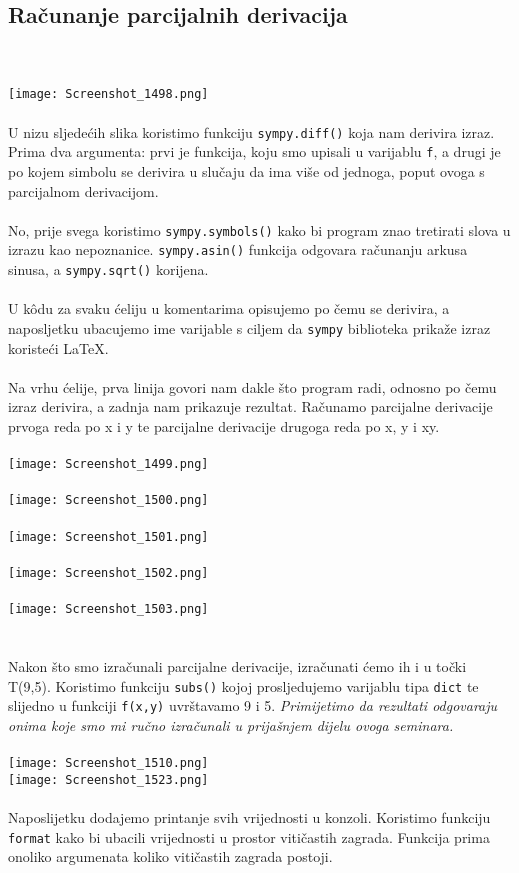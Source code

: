 \documentclass{article}
\begin{document}
\pagebreak

\subsection{Računanje parcijalnih derivacija}
\\~\\
\texttt{[image: Screenshot\_1498.png]}
\\~\\
U nizu sljedećih slika koristimo funkciju \texttt{sympy.diff()} koja nam derivira izraz. Prima dva argumenta: prvi je funkcija, koju smo upisali u varijablu \texttt{f}, a drugi je po kojem simbolu se derivira u slučaju da ima više od jednoga, poput ovoga s parcijalnom derivacijom.
\\~\\
No, prije svega koristimo \texttt{sympy.symbols()} kako bi program znao tretirati slova u izrazu kao nepoznanice. \texttt{sympy.asin()} funkcija odgovara računanju arkusa sinusa, a \texttt{sympy.sqrt()} korijena. 
\\~\\
U kôdu za svaku ćeliju u komentarima opisujemo po čemu se derivira, a naposljetku ubacujemo ime varijable s ciljem da \texttt{sympy} biblioteka prikaže izraz koristeći LaTeX.
\\~\\
Na vrhu ćelije, prva linija govori nam dakle što program radi, odnosno po čemu izraz derivira, a zadnja nam prikazuje rezultat. Računamo parcijalne derivacije prvoga reda po x i y te parcijalne derivacije drugoga reda po x, y i xy.
\\~\\
\texttt{[image: Screenshot\_1499.png]}
\\~\\
\texttt{[image: Screenshot\_1500.png]}
\\~\\
\texttt{[image: Screenshot\_1501.png]}
\\~\\
\texttt{[image: Screenshot\_1502.png]}
\\~\\
\texttt{[image: Screenshot\_1503.png]}
\\~\\
\pagebreak
\\
Nakon što smo izračunali parcijalne derivacije, izračunati ćemo ih i u točki T(9,5). Koristimo funkciju \texttt{subs()} kojoj prosljedujemo varijablu tipa \texttt{dict} te slijedno u funkciji \texttt{f(x,y)} uvrštavamo 9 i 5. \textit{Primijetimo da rezultati odgovaraju onima koje smo mi ručno izračunali u prijašnjem dijelu ovoga seminara.}
\\ \\
\texttt{[image: Screenshot\_1510.png]}
\\
\texttt{[image: Screenshot\_1523.png]}
\\~\\
Naposlijetku dodajemo printanje svih vrijednosti u konzoli. Koristimo funkciju \texttt{format} kako bi ubacili vrijednosti u prostor vitičastih zagrada. Funkcija prima onoliko argumenata koliko vitičastih zagrada postoji.
\end{document}
